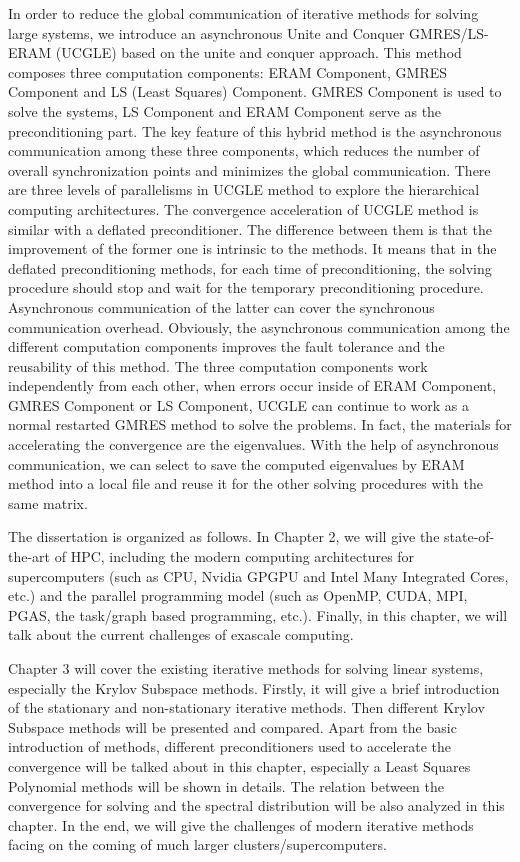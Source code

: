 In order to reduce the global communication of iterative methods for solving large systems, we introduce an asynchronous Unite and Conquer GMRES/LS-ERAM (UCGLE) based on the unite and conquer approach. This method composes three computation components: ERAM Component, GMRES Component and LS (Least Squares) Component. GMRES Component is used to solve the systems, LS Component and ERAM Component serve as the preconditioning part. The key feature of this hybrid method is the asynchronous communication among these three components, which reduces the number of overall synchronization points and minimizes the global communication. There are three levels of parallelisms in UCGLE method to explore the hierarchical computing architectures. The convergence acceleration of UCGLE method is similar with a deflated preconditioner. The difference between them is that the improvement of the former one is intrinsic to the methods. It means that in the deflated preconditioning methods, for each time of preconditioning, the solving procedure should stop and wait for the temporary preconditioning procedure. Asynchronous communication of the latter can cover the synchronous communication overhead. Obviously, the asynchronous communication among the different computation components improves the fault tolerance and the reusability of this method. The three computation components work independently from each other, when errors occur inside of ERAM Component, GMRES Component or LS Component, UCGLE can continue to work as a normal restarted GMRES method to solve the problems. In fact, the materials for accelerating the convergence are the eigenvalues. With the help of asynchronous communication, we can select to save the computed eigenvalues by ERAM method into a local file and reuse it for the other solving procedures with the same matrix. 

The dissertation is organized as follows. In Chapter 2, we will give the state-of-the-art of HPC, including the modern computing architectures for supercomputers (such as CPU, Nvidia GPGPU and Intel Many Integrated Cores, etc.) and the parallel programming model (such as OpenMP, CUDA, MPI, PGAS, the task/graph based programming, etc.). Finally, in this chapter, we will talk about the current challenges of exascale computing.

Chapter 3 will cover the existing iterative methods for solving linear systems, especially the Krylov Subspace methods. Firstly, it will give a brief introduction of the stationary and non-stationary iterative methods. Then different Krylov Subspace methods will be presented and compared. Apart from the basic introduction of methods, different preconditioners used to accelerate the convergence will be talked about in this chapter, especially a Least Squares Polynomial methods will be shown in details. The relation between the convergence for solving and the spectral distribution will be also analyzed in this chapter. In the end, we will give the challenges of modern iterative methods facing on the coming of much larger clusters/supercomputers.

